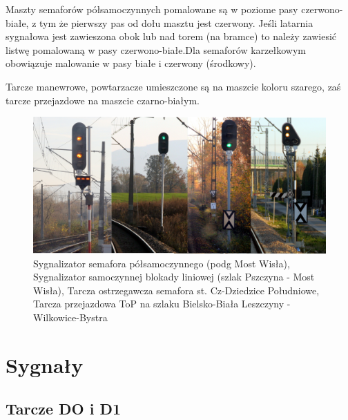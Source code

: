 Maszty semaforów półsamoczynnych pomalowane są w poziome pasy czerwono-białe, z tym że pierwszy pas od dołu masztu jest czerwony. Jeśli latarnia sygnałowa jest zawieszona obok lub nad torem (na bramce) to należy zawiesić listwę pomalowaną
w pasy czerwono-białe.Dla semaforów karzełkowym obowiązuje malowanie w pasy białe i czerwony (środkowy).

Tarcze manewrowe, powtarzacze umieszczone są na maszcie koloru szarego, zaś tarcze przejazdowe na maszcie czarno-białym.

	\begin{figure}
		\includegraphics[width=15cm]{skryptkierownik-img/sygnalizatory.png}
		\caption{Sygnalizator semafora półsamoczynnego (podg Most Wisła), Sygnalizator samoczynnej blokady liniowej (szlak Pszczyna - Most Wisła), Tarcza ostrzegawcza semafora st. Cz-Dziedzice Południowe, Tarcza przejazdowa ToP na szlaku Bielsko-Biała Leszczyny - Wilkowice-Bystra}
	\end{figure}


\section{Sygnały}

\subsection{Tarcze DO i D1}

